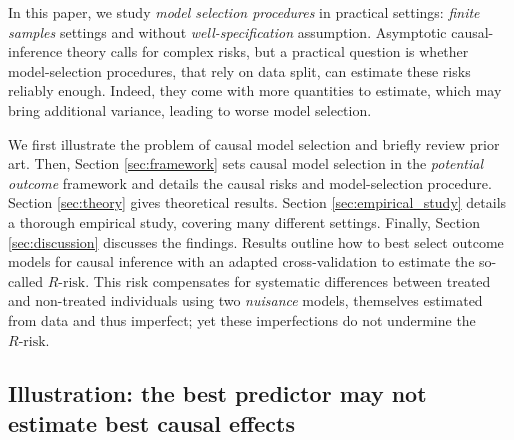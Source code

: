 \documentclass[10pt]{article}
\begin{document}
\begin{multicols}{2}
    In this paper, we study \textit{model selection procedures}
    in practical settings: \textit{finite samples} settings and without
    \textit{well-specification} assumption. Asymptotic causal-inference
    theory calls for complex risks, but a practical question is
    whether model-selection procedures, that rely on data split, can estimate
    these risks reliably enough. Indeed, they
    come with more quantities to estimate, which may
    bring additional variance, leading to worse model selection.

    We first illustrate the problem of causal model
    selection and briefly review prior art. Then, Section
    \ref{sec:framework} sets causal model selection in the
    \emph{potential outcome} framework and details the causal risks and
    model-selection procedure. Section \ref{sec:theory} gives theoretical
    results. Section \ref{sec:empirical_study} details a thorough empirical
    study, covering many different settings. Finally, Section \ref{sec:discussion}
    discusses the findings.
    Results outline how to best select outcome models for causal
    inference with an adapted
    cross-validation to estimate the so-called $R\text{-risk}$.
    This risk compensates for systematic
    differences between treated and non-treated individuals using
    two \emph{nuisance} models,
    themselves estimated from data and thus imperfect; yet these
    imperfections do not undermine the $R\text{-risk}$.



    \subsection{Illustration: the best predictor may not estimate best causal
        effects}%


\end{multicols}
\end{document}
